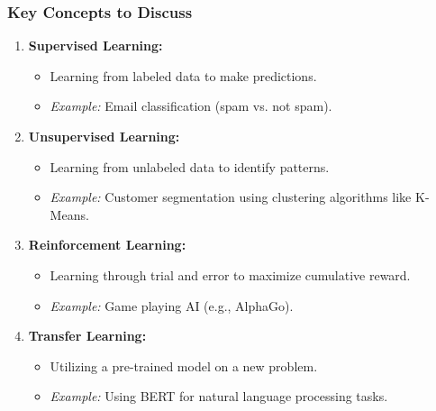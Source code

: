 \documentclass[aspectratio=169]{beamer}
\begin{document}
\begin{frame}[fragile]
    \frametitle{Key Concepts to Discuss}
    
    \begin{enumerate}
        \item \textbf{Supervised Learning:}
            \begin{itemize}
                \item Learning from labeled data to make predictions.
                \item \textit{Example:} Email classification (spam vs. not spam).
            \end{itemize}
        
        \item \textbf{Unsupervised Learning:}
            \begin{itemize}
                \item Learning from unlabeled data to identify patterns.
                \item \textit{Example:} Customer segmentation using clustering algorithms like K-Means.
            \end{itemize}
        
        \item \textbf{Reinforcement Learning:}
            \begin{itemize}
                \item Learning through trial and error to maximize cumulative reward.
                \item \textit{Example:} Game playing AI (e.g., AlphaGo).
            \end{itemize}
        
        \item \textbf{Transfer Learning:}
            \begin{itemize}
                \item Utilizing a pre-trained model on a new problem.
                \item \textit{Example:} Using BERT for natural language processing tasks.
            \end{itemize}
    \end{enumerate}
\end{frame}
\end{document}
